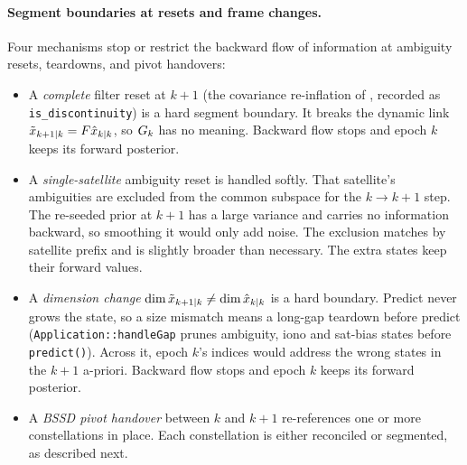 \documentclass[main.tex]{subfiles}
\begin{document}
\paragraph{Segment boundaries at resets and frame changes.}
Four mechanisms stop or restrict the backward flow of information at
ambiguity resets, teardowns, and pivot handovers:
\begin{itemize}[leftmargin=*, itemsep=0pt]
\item A \emph{complete} filter reset at $k{+}1$ (the covariance
      re-inflation of , recorded as
      \texttt{is\_discontinuity}) is a hard segment boundary.  It breaks
      the dynamic link $\tilde{x}_{k+1|k} = F\hat{x}_{k|k}$,
      so $G_k$ has no meaning.  Backward flow stops and epoch $k$
      keeps its forward posterior.
\item A \emph{single-satellite} ambiguity reset is handled softly.  That
      satellite's ambiguities are excluded from the common subspace for
      the $k\!\to\!k{+}1$ step.  The re-seeded prior at $k{+}1$ has a
      large variance and carries no information backward, so smoothing
      it would only add noise.  The exclusion matches by satellite
      prefix and is slightly broader than necessary.  The extra states
      keep their forward values.
\item A \emph{dimension change}
      $\dim\tilde{x}_{k+1|k} \neq \dim\hat{x}_{k|k}$ is a hard
      boundary.  Predict never grows the state, so a size mismatch means
      a long-gap teardown before predict
      (\texttt{Application::handleGap} prunes ambiguity, iono and
      sat-bias states before \texttt{predict()}).  Across it, epoch $k$'s
      indices would address the wrong states in the $k{+}1$ a-priori.
      Backward flow stops and epoch $k$ keeps its forward posterior.
\item A \emph{BSSD pivot handover} between $k$ and $k{+}1$ re-references
      one or more constellations in place.  Each constellation is either
      reconciled or segmented, as described next.
\end{itemize}
\end{document}
